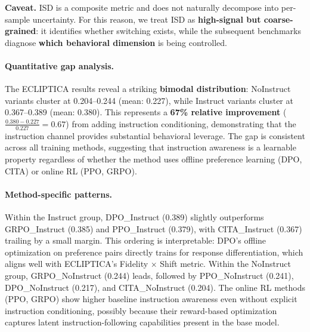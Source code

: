 \vspace{-0.2em}
\noindent\textbf{Caveat.}
ISD is a composite metric and does not naturally decompose into per-sample uncertainty.
For this reason, we treat ISD as \textbf{high-signal but coarse-grained}: it identifies whether switching exists, while the subsequent benchmarks diagnose \textbf{which behavioral dimension} is being controlled.

\paragraph{Quantitative gap analysis.}
The ECLIPTICA results reveal a striking \textbf{bimodal distribution}: NoInstruct variants cluster at 0.204--0.244 (mean: 0.227), while Instruct variants cluster at 0.367--0.389 (mean: 0.380).
This represents a \textbf{67\% relative improvement} ($\frac{0.380 - 0.227}{0.227} = 0.67$) from adding instruction conditioning, demonstrating that the instruction channel provides substantial behavioral leverage.
The gap is consistent across all training methods, suggesting that instruction awareness is a learnable property regardless of whether the method uses offline preference learning (DPO, \textsc{CITA}) or online RL (PPO, GRPO).

\paragraph{Method-specific patterns.}
Within the Instruct group, \textsc{DPO}\_Instruct (0.389) slightly outperforms \textsc{GRPO}\_Instruct (0.385) and \textsc{PPO}\_Instruct (0.379), with \textsc{CITA}\_Instruct (0.367) trailing by a small margin.
This ordering is interpretable: DPO's offline optimization on preference pairs directly trains for response differentiation, which aligns well with ECLIPTICA's Fidelity $\times$ Shift metric.
Within the NoInstruct group, \textsc{GRPO}\_NoInstruct (0.244) leads, followed by \textsc{PPO}\_NoInstruct (0.241), \textsc{DPO}\_NoInstruct (0.217), and \textsc{CITA}\_NoInstruct (0.204).
The online RL methods (PPO, GRPO) show higher baseline instruction awareness even without explicit instruction conditioning, possibly because their reward-based optimization captures latent instruction-following capabilities present in the base model.


